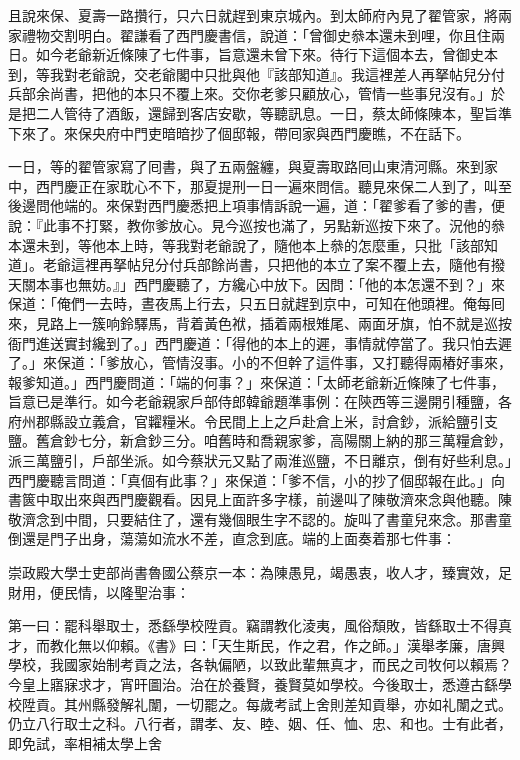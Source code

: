 且說來保、夏壽一路攢行，只六日就趕到東京城內。到太師府內見了翟管家，將兩家禮物交割明白。翟謙看了西門慶書信，說道：「曾御史叅本還未到哩，{}你且住兩日。如今老爺新近條陳了七件事，旨意還未曾下來。待行下這個本去，曾御史本到，等我對老爺說，交老爺閣中只批與他『該部知道』。我這裡差人再拏帖兒分付兵部余尚書，把他的本只不覆上來。交你老爹只顧放心，管情一些事兒沒有。」於是把二人管待了酒飯，還歸到客店安歇，等聽訊息。一日，蔡太師條陳本，聖旨準下來了。來保央府中門吏暗暗抄了個邸報，帶囘家與西門慶瞧，不在話下。

一日，等的翟管家寫了囘書，與了五兩盤纏，與夏壽取路囘山東清河縣。來到家中，西門慶正在家耽心不下，那夏提刑一日一遍來問信。聽見來保二人到了，叫至後邊問他端的。來保對西門慶悉把上項事情訴說一遍，道：「翟爹看了爹的書，便說：『此事不打緊，教你爹放心。見今巡按也滿了，另點新巡按下來了。況他的叅本還未到，等他本上時，等我對老爺說了，隨他本上叅的怎麼重，只批「該部知道」。老爺這裡再拏帖兒分付兵部餘尚書，只把他的本立了案不覆上去，隨他有撥天關本事也無妨。』」西門慶聽了，方纔心中放下。因問：「他的本怎還不到？」來保道：「俺們一去時，晝夜馬上行去，只五日就趕到京中，可知在他頭裡。俺每囘來，見路上一簇响鈴驛馬，背着黃色袱，插着兩根雉尾、兩面牙旗，怕不就是巡按衙門進送實封纔到了。」西門慶道：「得他的本上的遲，事情就停當了。我只怕去遲了。」來保道：「爹放心，管情沒事。小的不但幹了這件事，又打聽得兩樁好事來，報爹知道。」西門慶問道：「端的何事？」來保道：「太師老爺新近條陳了七件事，旨意已是準行。如今老爺親家戶部侍郎韓爺題準事例：在陝西等三邊開引種鹽，各府州郡縣設立義倉，官糶糧米。令民間上上之戶赴倉上米，討倉鈔，派給鹽引支鹽。舊倉鈔七分，新倉鈔三分。咱舊時和喬親家爹，高陽關上納的那三萬糧倉鈔，派三萬鹽引，戶部坐派。如今蔡狀元又點了兩淮巡鹽，不日離京，倒有好些利息。」{}西門慶聽言問道：「真個有此事？」來保道：「爹不信，小的抄了個邸報在此。」向書篋中取出來與西門慶觀看。因見上面許多字樣，前邊叫了陳敬濟來念與他聽。陳敬濟念到中間，只要結住了，還有幾個眼生字不認的。旋叫了書童兒來念。那書童倒還是門子出身，蕩蕩如流水不差，直念到底。端的上面奏着那七件事：

崇政殿大學士吏部尚書魯國公蔡京一本：為陳愚見，竭愚衷，收人才，臻實效，足財用，便民情，以隆聖治事：{}

第一曰：罷科舉取士，悉繇學校陞貢。竊謂教化淩夷，風俗頹敗，皆繇取士不得真才，而教化無以仰賴。《書》曰：「天生斯民，作之君，作之師。」漢舉孝廉，唐興學校，我國家始制考貢之法，各執偏陋，以致此輩無真才，而民之司牧何以賴焉？今皇上寤寐求才，宵旰圖治。治在於養賢，養賢莫如學校。今後取士，悉遵古繇學校陞貢。其州縣發解礼闈，一切罷之。每歲考試上舍則差知貢舉，亦如礼闈之式。仍立八行取士之科。八行者，謂孝、友、睦、姻、任、恤、忠、和也。士有此者，即免試，率相補太學上舍

